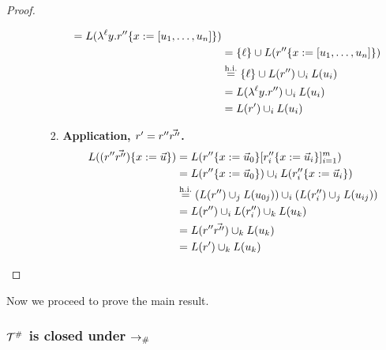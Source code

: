 \begin{proof}
\begin{enumerate}
\begin{enumerate}
\begin{enumerate}
\begin{equation*}
\begin{split}
                 = L(\lambda^{\ell} y. r''\{x := [u_1, \hdots, u_n]\}) \\
               & = \{\ell\} \cup L(r''\{x := [u_1, \hdots, u_n]\}) \\
           & \overset{\mathrm{h.i.}}{=} \{\ell\} \cup L(r'') \cup_i L(u_i) \\
               & = L(\lambda^{\ell} y. r'') \cup_i L(u_i) \\
               & = L(r') \cup_i L(u_i) \\
        \end{split}\end{equation*}
        \item {\bf Application, $r' = r'' \vec{r''}$.}
        \begin{equation*}\begin{split}
          L((r'' \vec{r''})\{x := \vec{u}\})
               & = L(r''\{x := \vec{u}_0\}
                     [r''_i\{x := \vec{u}_i\}]_{i=1}^m) \\
               & = L(r''\{x := \vec{u}_0\})
                     \cup_i L(r''_i\{x := \vec{u}_i\}) \\
           & \overset{\mathrm{h.i.}}{=} \left( L(r'') \cup_j L(u_{0j}) \right)
                     \cup_i \left( L(r''_i) \cup_j L(u_{ij}) \right) \\
               & = L(r'') \cup_i L(r''_i) \cup_k L(u_k) \\
               & = L(r'' \vec{r''}) \cup_k L(u_k) \\
               & = L(r') \cup_k L(u_k) \\
        \end{split}\end{equation*}
      \end{enumerate}
    \end{enumerate}
  \end{enumerate}
\end{proof}

Now we proceed to prove the main result.
\subsubsection{$\mathcal{T}^{\mathtt{\#}}$ is closed under $\mathrel{\to_{\mathtt{\#}}}$}

